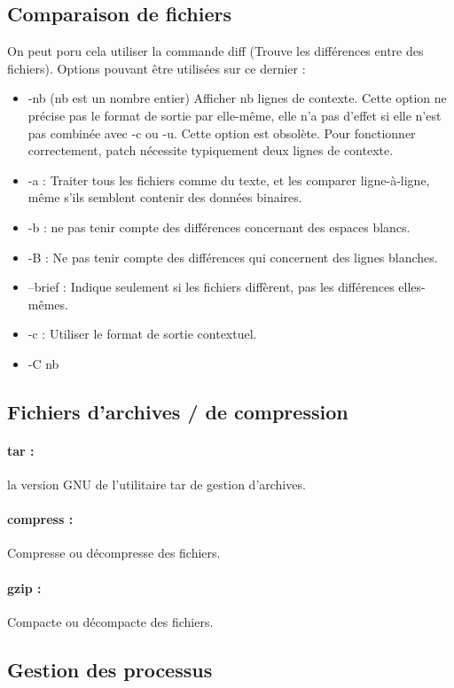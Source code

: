 \documentclass{article}[12pt]
\begin{document}
\subsection{Comparaison de fichiers}
On peut poru cela utiliser la commande diff (Trouve les différences entre des fichiers). Options pouvant être utilisées sur ce dernier :
\begin{itemize}
\item -nb (nb est un nombre entier) Afficher nb lignes de contexte. Cette option ne précise pas le format de sortie par elle-même, elle n'a pas d'effet si elle n'est pas combinée avec -c ou -u. Cette option est obsolète. Pour fonctionner correctement, patch nécessite typiquement deux lignes de contexte.
\item -a : Traiter tous les fichiers comme du texte, et les comparer ligne-à-ligne, même s'ils semblent contenir des données binaires.
\item -b : ne pas tenir compte des différences concernant des espaces blancs.
\item -B : Ne pas tenir compte des différences qui concernent des lignes blanches.
\item --brief : Indique seulement si les fichiers diffèrent, pas les différences elles-mêmes.
\item -c : Utiliser le format de sortie contextuel.
\item -C nb
\end{itemize}
\subsection{Fichiers d'archives / de compression}
\paragraph{tar : } la version GNU de l'utilitaire tar de gestion d'archives.  
\paragraph{compress : } Compresse ou décompresse des fichiers.
\paragraph{gzip : } Compacte ou décompacte des fichiers. 
\subsection{Gestion des processus}
\end{document}
